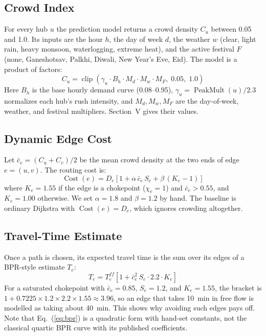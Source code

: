 \documentclass[conference]{IEEEtran}
\begin{document}
\subsection{Crowd Index}
For every hub $u$ the prediction model returns a crowd density $C_u$ between 0.05 and 1.0. Its inputs are the hour $h$, the day of week $d$, the weather $w$ (clear, light rain, heavy monsoon, waterlogging, extreme heat), and the active festival $F$ (none, Ganeshotsav, Palkhi, Diwali, New Year's Eve, Eid). The model is a product of factors:
\begin{equation}
C_u = \operatorname{clip}\!\left(\gamma_u \cdot B_h \cdot M_d \cdot M_w \cdot M_F,\; 0.05,\; 1.0\right)
\label{eq:crowd}
\end{equation}
Here $B_h$ is the base hourly demand curve (0.08--0.95), $\gamma_u = \operatorname{PeakMult}(u)/2.3$ normalizes each hub's rush intensity, and $M_d, M_w, M_F$ are the day-of-week, weather, and festival multipliers. Section~V gives their values.

\subsection{Dynamic Edge Cost}
Let $\bar{c}_e = (C_u + C_v)/2$ be the mean crowd density at the two ends of edge $e = (u, v)$. The routing cost is:
\begin{equation}
\operatorname{Cost}(e) = D_e \left[1 + \alpha\,\bar{c}_e\,S_e + \beta\,(K_e - 1)\right]
\label{eq:cost}
\end{equation}
where $K_e = 1.55$ if the edge is a chokepoint ($\chi_e = 1$) and $\bar{c}_e > 0.55$, and $K_e = 1.00$ otherwise. We set $\alpha = 1.8$ and $\beta = 1.2$ by hand. The baseline is ordinary Dijkstra with $\operatorname{Cost}(e) = D_e$, which ignores crowding altogether.

\subsection{Travel-Time Estimate}
Once a path is chosen, its expected travel time is the sum over its edges of a BPR-style estimate $T_e$:
\begin{equation}
T_e = T_e^{ff} \left[1 + \bar{c}_e^2\,S_e \cdot 2.2 \cdot K_e\right]
\label{eq:bpr}
\end{equation}
For a saturated chokepoint with $\bar{c}_e = 0.85$, $S_e = 1.2$, and $K_e = 1.55$, the bracket is $1 + 0.7225 \times 1.2 \times 2.2 \times 1.55 \approx 3.96$, so an edge that takes 10~min in free flow is modelled as taking about 40~min. This shows why avoiding such edges pays off. Note that Eq.~(\ref{eq:bpr}) is a quadratic form with hand-set constants, not the classical quartic BPR curve with its published coefficients.
\end{document}
